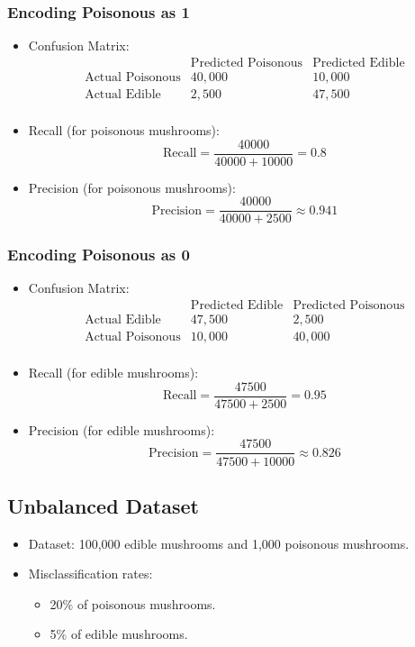\begin{notechapter}
\subsubsection{Encoding Poisonous as 1}
\begin{itemize}
    \item Confusion Matrix:
    \[
    \begin{array}{c|cc}
        & \text{Predicted Poisonous} & \text{Predicted Edible} \\
        \hline
        \text{Actual Poisonous} & 40,000 & 10,000 \\
        \text{Actual Edible} & 2,500 & 47,500 \\
    \end{array}
    \]
    \item Recall (for poisonous mushrooms):
    \[
    \text{Recall} = \frac{40000}{40000 + 10000} = 0.8
    \]
    \item Precision (for poisonous mushrooms):
    \[
    \text{Precision} = \frac{40000}{40000 + 2500} \approx 0.941
    \]
\end{itemize}

\subsubsection{Encoding Poisonous as 0}
\begin{itemize}
    \item Confusion Matrix:
    \[
    \begin{array}{c|cc}
        & \text{Predicted Edible} & \text{Predicted Poisonous} \\
        \hline
        \text{Actual Edible} & 47,500 & 2,500 \\
        \text{Actual Poisonous} & 10,000 & 40,000 \\
    \end{array}
    \]
    \item Recall (for edible mushrooms):
    \[
    \text{Recall} = \frac{47500}{47500 + 2500} = 0.95
    \]
    \item Precision (for edible mushrooms):
    \[
    \text{Precision} = \frac{47500}{47500 + 10000} \approx 0.826
    \]
\end{itemize}

\subsection{Unbalanced Dataset}
\begin{itemize}
    \item Dataset: 100,000 edible mushrooms and 1,000 poisonous 
    mushrooms.
    \item Misclassification rates:
        \begin{itemize}
            \item 20\% of poisonous mushrooms.
            \item 5\% of edible mushrooms.
        \end{itemize}
\end{itemize}


\end{notechapter}
